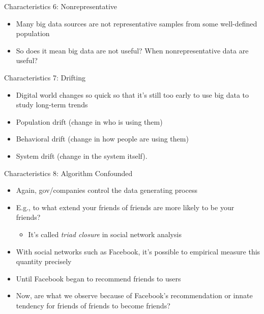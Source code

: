 \documentclass[handout]{beamer}
\begin{document}
\begin{frame}[label={h:a41b8b80-32b9-46dc-94a2-21f44f22416f}]{Characteristics 6: Nonrepresentative}
\begin{itemize}
\item Many big data sources are not representative samples from some well-defined population
\item{} So does it mean big data are not useful? When nonrepresentative data are useful?
\end{itemize}
\end{frame}
\begin{frame}[label={h:6eea847d-4ecf-44b6-be80-1d560f1ae8c8}]{Characteristics 7: Drifting}
\begin{itemize}
\item Digital world changes so quick so that it's still too early to use big data to study long-term trends
\item Population drift (change in who is using them)
\item Behavioral drift (change in how people are using them)
\item System drift (change in the system itself).
\end{itemize}
\end{frame}
\begin{frame}[label={h:9b2a4fa4-28ac-4ef8-a0b6-50284db8c352}]{Characteristics 8: Algorithm Confounded}
\begin{itemize}
\item Again, gov/companies control the data generating process
\item E.g., to what extend your friends of friends are more likely to be your friends?
\begin{itemize}
\item It's called \emph{triad closure} in social network analysis
\end{itemize}
\item With social networks such as Facebook, it's possible to empirical measure this quantity precisely
\item Until Facebook began to recommend friends to users
\item Now, are what we observe because of Facebook's recommendation or innate tendency for friends of friends to become friends?
\end{itemize}
\end{frame}
\end{document}
